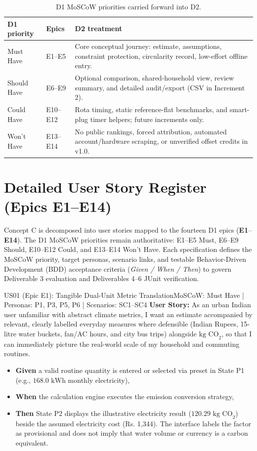 \documentclass[12pt, a4paper]{article}
\begin{document}
\begin{table}[H]
\centering
\small
\begin{tabularx}{\textwidth}{@{}l l X@{}}
\toprule
\textbf{D1 priority} & \textbf{Epics} & \textbf{D2 treatment} \\
\midrule
Must Have & E1--E5 & Core conceptual journey: estimate, assumptions, constraint protection, circularity record, low-effort offline entry. \\
Should Have & E6--E9 & Optional comparison, shared-household view, review summary, and detailed audit/export (CSV in Increment 2). \\
Could Have & E10--E12 & Rota timing, static reference-flat benchmarks, and smart-plug timer helpers; future increments only. \\
Won't Have & E13--E14 & No public rankings, forced attribution, automated account/hardware scraping, or unverified offset credits in v1.0. \\
\bottomrule
\end{tabularx}
\caption{D1 MoSCoW priorities carried forward into D2.}
\label{tab:priority-trace}
\end{table}

\section{Detailed User Story Register (Epics E1--E14)}
Concept C is decomposed into user stories mapped to the fourteen D1 epics (\textbf{E1}--\textbf{E14}). The D1 MoSCoW priorities remain authoritative: E1--E5 Must, E6--E9 Should, E10--E12 Could, and E13--E14 Won't Have. Each specification defines the MoSCoW priority, target personas, scenario links, and testable Behavior-Driven Development (BDD) acceptance criteria (\textit{Given / When / Then}) to govern Deliverable 3 evaluation and Deliverables 4--6 JUnit verification.

\begin{storybox}{US01 (Epic E1): Tangible Dual-Unit Metric Translation}{MoSCoW: Must Have | Personas: P1, P3, P5, P6 | Scenarios: SC1--SC4}
\textbf{User Story:} As an urban Indian user unfamiliar with abstract climate metrics, I want an estimate accompanied by relevant, clearly labelled everyday measures where defensible (Indian Rupees, 15-litre water buckets, fan/AC hours, and city bus trips) alongside $\text{kg CO}_2$, so that I can immediately picture the real-world scale of my household and commuting routines.
\begin{itemize}
    \item \textbf{Given} a valid routine quantity is entered or selected via preset in State P1 (e.g., $168.0\text{ kWh}$ monthly electricity),
    \item \textbf{When} the calculation engine executes the emission conversion strategy,
    \item \textbf{Then} State P2 displays the illustrative electricity result ($120.29\text{ kg CO}_2$) beside the assumed electricity cost (Rs. 1,344). The interface labels the factor as provisional and does not imply that water volume or currency is a carbon equivalent.
\end{itemize}
\end{storybox}
\end{document}

